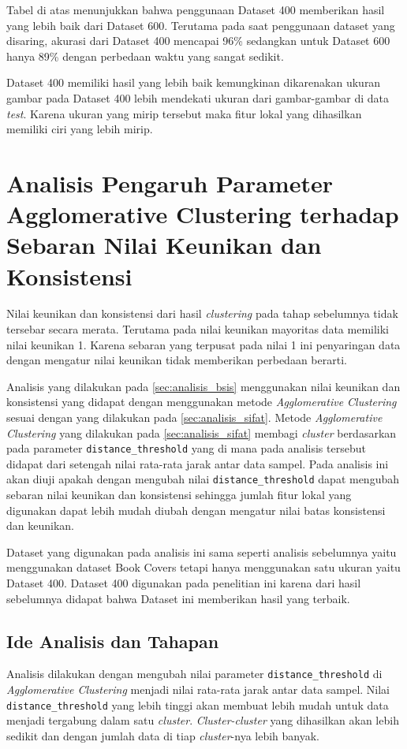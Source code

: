 Tabel di atas menunjukkan bahwa penggunaan Dataset 400 memberikan hasil yang lebih baik dari Dataset 600. Terutama pada saat penggunaan dataset yang disaring, akurasi dari Dataset 400 mencapai 96\% sedangkan untuk Dataset 600 hanya 89\% dengan perbedaan waktu yang sangat sedikit.

Dataset 400 memiliki hasil yang lebih baik kemungkinan dikarenakan ukuran gambar pada Dataset 400 lebih mendekati ukuran dari gambar-gambar di data \textit{test}. Karena ukuran yang mirip tersebut maka fitur lokal yang dihasilkan memiliki ciri yang lebih mirip.

\section{Analisis Pengaruh Parameter Agglomerative Clustering terhadap Sebaran Nilai Keunikan dan Konsistensi}
\label{sec:analisis_parameter_clustering}
Nilai keunikan dan konsistensi dari hasil \textit{clustering} pada tahap sebelumnya tidak tersebar secara merata. Terutama pada nilai keunikan mayoritas data memiliki nilai keunikan 1. Karena sebaran yang terpusat pada nilai 1 ini penyaringan data dengan mengatur nilai keunikan tidak memberikan perbedaan berarti. 

Analisis yang dilakukan pada \ref{sec:analisis_bsis} menggunakan nilai keunikan dan konsistensi yang didapat dengan menggunakan metode \textit{Agglomerative Clustering} sesuai dengan yang dilakukan pada \ref{sec:analisis_sifat}. Metode \textit{Agglomerative Clustering} yang dilakukan pada \ref{sec:analisis_sifat} membagi \textit{cluster} berdasarkan pada parameter \texttt{distance\_threshold} yang di mana pada analisis tersebut didapat dari setengah nilai rata-rata jarak antar data sampel. Pada analisis ini akan diuji apakah dengan mengubah nilai \texttt{distance\_threshold} dapat mengubah sebaran nilai keunikan dan konsistensi sehingga jumlah fitur lokal yang digunakan dapat lebih mudah diubah dengan mengatur nilai batas konsistensi dan keunikan.

Dataset yang digunakan pada analisis ini sama seperti analisis sebelumnya yaitu menggunakan dataset Book Covers tetapi hanya menggunakan satu ukuran yaitu Dataset 400. Dataset 400 digunakan pada penelitian ini karena dari hasil sebelumnya didapat bahwa Dataset ini memberikan hasil yang terbaik.

\subsection{Ide Analisis dan Tahapan}
Analisis dilakukan dengan mengubah nilai parameter \texttt{distance\_threshold} di \textit{Agglomerative Clustering} menjadi nilai rata-rata jarak antar data sampel. Nilai \texttt{distance\_threshold} yang lebih tinggi akan membuat lebih mudah untuk data menjadi tergabung dalam satu \textit{cluster}. \textit{Cluster-cluster} yang dihasilkan akan lebih sedikit dan dengan jumlah data di tiap \textit{cluster}-nya lebih banyak.

